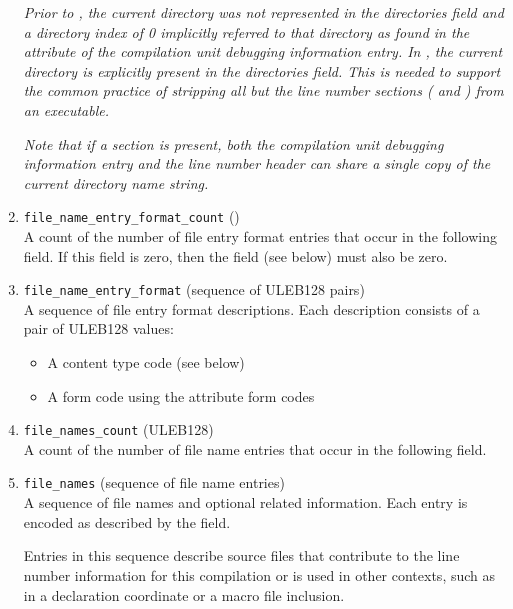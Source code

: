 \begin{enumerate}[1. ]
\textit{Prior to \DWARFVersionV, the current directory was not
represented in the directories field and a directory index
of 0 implicitly referred to that directory as found in the
\DWATcompdir{} attribute of the compilation unit 
debugging information entry. 
In \DWARFVersionV, the current directory is explicitly present
in the directories field. This is needed to support the
common practice of stripping all but the line number sections
(\dotdebugline{} and \dotdebuglinestr) from an executable.}

\textit{Note that if a \dotdebuglinestr{} section is present, 
both the compilation unit debugging information entry 
and the line number header can
share a single copy of the current directory name string.}

\item \texttt{file\_name\_entry\_format\_count} (\HFTubyte) \\
A count of the number of file entry format entries that
occur in the following  field. 
If this field is zero, then the  field 
(see below) must also be zero.

\item \texttt{file\_name\_entry\_format} (sequence of ULEB128 pairs) \\
A sequence of file entry format descriptions.
Each description consists of a pair of ULEB128 values:
\begin{itemize}
\setlength{\itemsep}{0em}
\item A content type code (see below)
\item A form code using the attribute form codes
\end{itemize}

\item \texttt{file\_names\_count} (ULEB128) \\
A count of the number of file name entries that occur
in the following  field.

\item \texttt{file\_names} (sequence of file name entries) \\
A sequence of file names and optional related
information. Each entry is encoded as described
by the  field.
  
Entries in this sequence describe source files that
contribute to the line number information for this
compilation or is used in other contexts, such as in
a declaration coordinate or a macro file inclusion.
 

\end{enumerate}
